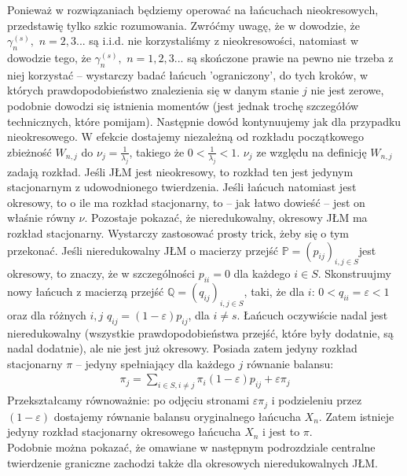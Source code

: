 \documentclass[a4paper]{article}
\begin{document}
Ponieważ w rozwiązaniach będziemy operować na łańcuchach nieokresowych, przedstawię tylko szkic rozumowania. Zwróćmy uwagę, że w dowodzie, że $\gamma_n^{(s)},\,\, n = 2,3...$ są i.i.d. nie korzystaliśmy z nieokresowości, natomiast w dowodzie tego, że $\gamma_n^{(s)},\,\, n = 1,2,3...$ są skończone prawie na pewno nie trzeba z niej korzystać – wystarczy badać łańcuch 'ograniczony', do tych kroków, w których prawdopodobieństwo znalezienia się w danym stanie $j$ nie jest zerowe, podobnie dowodzi się istnienia momentów (jest jednak trochę szczegółów technicznych, które pomijam). Następnie dowód kontynuujemy jak dla przypadku nieokresowego. W efekcie dostajemy niezależną od rozkładu początkowego zbieżność $W_{n,j}$ do $\nu_j = \frac{1}{\lambda_j}$, takiego że $0 < \frac{1}{\lambda_j} < 1$. $\nu_j$ ze względu na definicję $W_{n,j}$ zadają rozkład. Jeśli JŁM jest nieokresowy, to rozkład ten jest jedynym stacjonarnym z udowodnionego twierdzenia. Jeśli łańcuch natomiast jest okresowy, to o ile ma rozkład stacjonarny, to – jak łatwo dowieść – jest on właśnie równy $\nu$. Pozostaje pokazać, że nieredukowalny, okresowy JŁM ma rozkład stacjonarny. Wystarczy zastosować prosty trick, żeby się o tym przekonać. Jeśli nieredukowalny JŁM o macierzy przejść $\mathbb{P} = (p_{ij})_{i,j \in S}$jest okresowy, to znaczy, że w szczególności $p_{ii} = 0$ dla każdego $i \in S$. Skonstruujmy nowy łańcuch z macierzą przejść $\mathbb{Q} = (q_{ij})_{i,j \in S}$, taki, że dla $i$: $0 < q_{ii} = \varepsilon < 1$ oraz dla różnych $i,j$ $q_{ij} = (1-\varepsilon)p_{ij}$, dla $i \neq s$. Łańcuch oczywiście nadal jest nieredukowalny (wszystkie prawdopodobieństwa przejść, które były dodatnie, są nadal dodatnie), ale nie jest już okresowy. Posiada zatem jedyny rozkład stacjonarny $\pi$ – jedyny spełniający dla każdego $j$ równanie balansu:
\begin{align*}
    \pi_j = \sum\limits_{i \in S, i \neq j} \pi_i (1-\varepsilon) p_{ij}  + \varepsilon \pi_j 
\end{align*}
Przekształcamy równoważnie: po odjęciu stronami $\varepsilon \pi_j$ i podzieleniu przez $(1-\varepsilon)$ dostajemy równanie balansu oryginalnego łańcucha $X_n$. Zatem istnieje jedyny rozkład stacjonarny okresowego łańcucha $X_n$ i jest to $\pi$.
\\
Podobnie można pokazać, że omawiane w następnym podrozdziale centralne twierdzenie graniczne zachodzi także dla okresowych nieredukowalnych JŁM.
\end{document}
